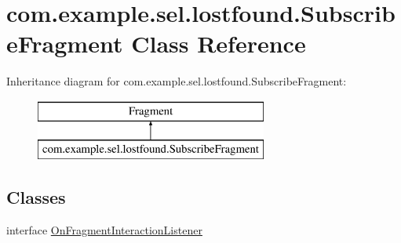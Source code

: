 \hypertarget{classcom_1_1example_1_1sel_1_1lostfound_1_1SubscribeFragment}{}\section{com.\+example.\+sel.\+lostfound.\+Subscribe\+Fragment Class Reference}
\label{classcom_1_1example_1_1sel_1_1lostfound_1_1SubscribeFragment}
Inheritance diagram for com.\+example.\+sel.\+lostfound.\+Subscribe\+Fragment\+:\begin{figure}[H]
\begin{center}
\leavevmode
\includegraphics[height=2.000000cm]{classcom_1_1example_1_1sel_1_1lostfound_1_1SubscribeFragment}
\end{center}
\end{figure}
\subsection*{Classes}
\begin{DoxyCompactItemize}
\item 
interface \hyperlink{interfacecom_1_1example_1_1sel_1_1lostfound_1_1SubscribeFragment_1_1OnFragmentInteractionListener}{On\+Fragment\+Interaction\+Listener}
\end{DoxyCompactItemize}
